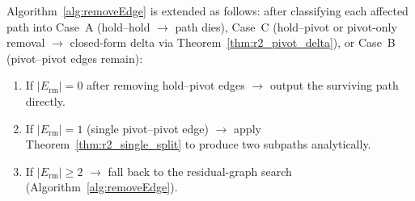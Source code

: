 Algorithm~\ref{alg:removeEdge} is extended as follows:
after classifying each affected path into Case~A (hold--hold $\to$ path dies), Case~C (hold--pivot or pivot-only removal $\to$ closed-form delta via Theorem~\ref{thm:r2_pivot_delta}), or Case~B (pivot--pivot edges remain):
\begin{enumerate}[leftmargin=*]
\item If $|E_{\mathrm{rm}}| = 0$ after removing hold--pivot edges $\to$ output the surviving path directly.
\item If $|E_{\mathrm{rm}}| = 1$ (single pivot--pivot edge) $\to$ apply Theorem~\ref{thm:r2_single_split} to produce two subpaths analytically.
\item If $|E_{\mathrm{rm}}| \ge 2$ $\to$ fall back to the residual-graph search (Algorithm~\ref{alg:removeEdge}).
\end{enumerate}


